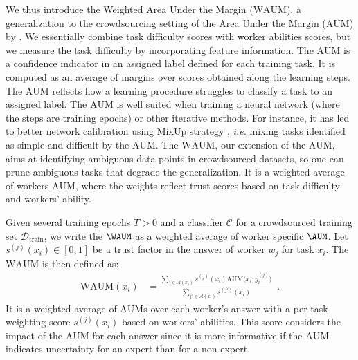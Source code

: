 We thus introduce the Weighted Area Under the Margin ($\mathrm{WAUM}$), a generalization to the crowdsourcing setting of the Area Under the Margin ($\mathrm{AUM}$) by \citet{pleiss_identifying_2020}.
We essentially combine task difficulty scores with worker abilities scores, but we measure the task difficulty by incorporating feature information.
The $\mathrm{AUM}$ is a confidence indicator in an assigned label defined for each training task.
It is computed as an average of margins over scores obtained along the learning steps.
The $\mathrm{AUM}$ reflects how a learning procedure struggles to classify a task to an assigned label.
The $\mathrm{AUM}$ is well suited when training a neural network (where the steps are training epochs) or other iterative methods.
For instance, it has led to better network calibration \citep{park2022calibration} using MixUp strategy \citep{zhang2017mixup}, \emph{i.e.} mixing tasks identified as simple and difficult by the $\mathrm{AUM}$.
The $\mathrm{WAUM}$, our extension of the $\mathrm{AUM}$, aims at identifying ambiguous data points in crowdsourced datasets, so one can prune ambiguous tasks that degrade the generalization.
It is a weighted average of workers $\mathrm{AUM}$, where the weights reflect trust scores based on task difficulty and workers' ability.

Given several training epochs $T>0$ and a classifier $\mathcal{C}$ for a crowdsourced training set $\mathcal{D}_\text{train}$, we write the $\WAUM$ as a weighted average of worker specific $\AUM$.
Let $s^{(j)}(x_i)\in [0,1]$ be a trust factor in the answer of worker $w_j$ for task $x_i$.
The $\mathrm{WAUM}$ is then defined as:
\begin{align}
    \label{eq:WAUM}
    \mathrm{WAUM}(x_i)
     &
    = \tfrac{
    \displaystyle \sum_{j\in\mathcal{A}(x_i)}  \!\!\!
    s^{(j)}(x_i) \mathrm{AUM}\big(x_i, y_i^{(j)}\big)
    }
    {\displaystyle\sum_{j'\in\mathcal{A}(x_i)}
    s^{(j')}(x_i)}
    \enspace.
\end{align}
It is a weighted average of $\mathrm{AUM}$s over each worker's answer with a per task weighting score $s^{(j)}(x_i)$ based on workers' abilities.
This score considers the impact of the $\mathrm{AUM}$ for each answer since it is more informative if the $\mathrm{AUM}$ indicates uncertainty for an expert than for a non-expert.


